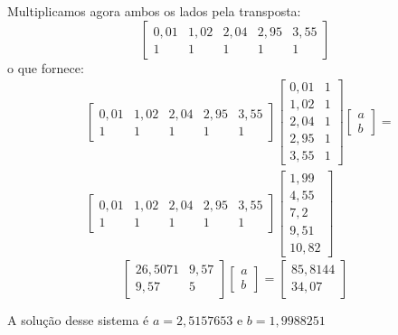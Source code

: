 \begin{sol}
Multiplicamos agora ambos os lados pela transposta:
\begin{equation*}
\left[\begin{array}{ccccc}
0,01 &1,02 &2,04 &2,95 &3,55\\
1 &1 &1 &1 &1
\end{array}
\right]
\end{equation*}
o que fornece:
\begin{align*}
&\left[\begin{array}{ccccc}
0,01 &1,02 &2,04 &2,95 &3,55\\
1 &1 &1 &1 &1
\end{array}
\right]
\left[\begin{array}{cc}
0,01 &1\\
1,02 &1\\
2,04 &1\\
2,95 &1\\
3,55 &1
\end{array}
\right]
\left[\begin{array}{c}
a\\
b
\end{array}
\right]
=\\
&\left[\begin{array}{ccccc}
0,01 &1,02 &2,04 &2,95 &3,55\\
1 &1 &1 &1 &1
\end{array}
\right]
\left[\begin{array}{c}
1,99\\
4,55\\
7,2\\
9,51\\
10,82
\end{array}
\right]  
\end{align*}
$$\left[
\begin{array}{cc}
26,5071  & 9,57 \\
  9,57  &     5
\end{array}
\right]
\left[
\begin{array}{c}
a   \\
b
\end{array}
\right]=
\left[
\begin{array}{c}
85,8144  \\
34,07
\end{array}
\right]
$$

A solução desse sistema é $a=2,5157653$ e $b=1,9988251$


\end{sol}
